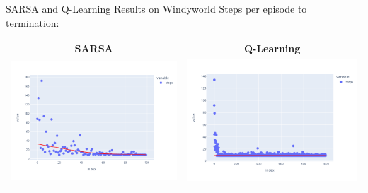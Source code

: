 \documentclass[ignorenonframetext,xcolor=x11names]{beamer}
\begin{document}
\begin{frame}{SARSA and Q-Learning Results on Windyworld}
Steps per episode to termination:\\

\begin{tabular}{cc}
\textbf{SARSA} & \textbf{Q-Learning} \\
\includegraphics[width=.49\textwidth]{rl_into/windyworld_sarsa.png} & 
\includegraphics[width=.49\textwidth]{rl_into/windyworld_q_learning.png} 
\end{tabular}
\end{frame}

\end{document}
